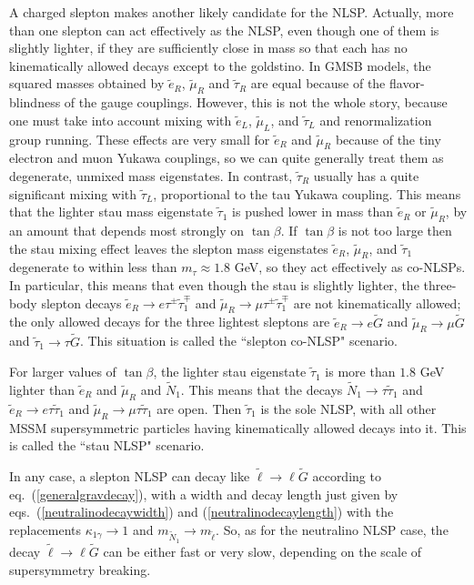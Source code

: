 \documentclass[11pt]{article}
\def\stilde{\widetilde}
\def\G{\stilde G}
\def\NI{\stilde N_1}
\begin{document}
A charged slepton makes another likely candidate for the NLSP. Actually, 
more than one slepton can act effectively as 
the NLSP, even though one of them is slightly lighter, if they are 
sufficiently close in mass so that each has no kinematically allowed 
decays except to the goldstino. In GMSB models, the squared masses 
obtained by $\widetilde e_R$, $\widetilde \mu_R$ and $\widetilde \tau_R$ 
are equal because of the flavor-blindness of the gauge couplings. However, 
this is not the whole story, because one must take into account mixing 
with $\widetilde e_L$, $\widetilde \mu_L$, and $\widetilde \tau_L$ and 
renormalization group running.  These effects are very small for 
$\widetilde e_R$ and $\widetilde \mu_R$ because of the tiny electron and 
muon Yukawa couplings, so we can quite generally treat them as degenerate, 
unmixed mass eigenstates. In contrast, $\widetilde \tau_R$ usually has a 
quite significant mixing with $\widetilde \tau_L$, proportional to the tau 
Yukawa coupling. This means that the lighter stau mass eigenstate 
$\widetilde \tau_1$ is pushed lower in mass than $\widetilde e_R$ or 
$\widetilde \mu_R$, by an amount that depends most strongly on 
$\tan\beta$.  If $\tan\beta$ is not too large then the stau mixing effect 
leaves the slepton mass eigenstates $\widetilde e_R$, $\widetilde \mu_R$, 
and $\widetilde \tau_1$ degenerate to within less than $m_\tau \approx 1.8 
$ GeV, so they act effectively as co-NLSPs.  In particular, this means 
that even though the stau is slightly lighter, the three-body slepton 
decays $\widetilde e_R \rightarrow e\tau^\pm\widetilde \tau_1^\mp$ and 
$\widetilde \mu_R \rightarrow \mu\tau^\pm\widetilde \tau_1^\mp$ are not 
kinematically allowed; the only allowed decays for the three lightest 
sleptons are $\widetilde e_R\rightarrow e \G$ and $\widetilde \mu_R 
\rightarrow \mu\G$ and $\widetilde \tau_1 \rightarrow \tau \G$. This 
situation is called the ``slepton co-NLSP" scenario.

For larger values of $\tan\beta$, the lighter stau eigenstate $\stilde 
\tau_1$ is more than $1.8$ GeV lighter than $\widetilde e_R$ and 
$\widetilde \mu_R$ and $\NI$.  This means that the decays $\NI \rightarrow 
\tau\stilde \tau_1$ and $\widetilde e_R \rightarrow e \tau \stilde \tau_1$ 
and $\widetilde \mu_R \rightarrow \mu \tau \stilde\tau_1$ are open. Then 
$\widetilde \tau_1$ is the sole NLSP, with all other MSSM supersymmetric 
particles having kinematically allowed decays into it. This is called the 
``stau NLSP" scenario.

In any case, a slepton NLSP can decay like $\stilde \ell \rightarrow \ell 
\G$ according to eq.~(\ref{generalgravdecay}), with a width and decay 
length just given by eqs.~(\ref{neutralinodecaywidth}) and 
(\ref{neutralinodecaylength}) with the replacements $\kappa_{1\gamma} 
\rightarrow 1$ and $m_{\stilde N_1} \rightarrow m_{\stilde \ell}$. So, as 
for the neutralino NLSP case, the decay $\stilde \ell \rightarrow \ell\G$ 
can be either fast or very slow, depending on the scale of supersymmetry 
breaking.
\end{document}
